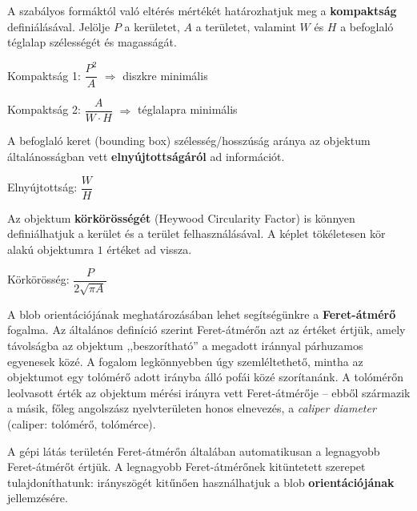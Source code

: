 A szabályos formáktól való eltérés mértékét határozhatjuk meg a \textbf{kompaktság} definiálásával. Jelölje $P$ a kerületet, $A$ a területet, valamint $W$ és $H$ a befoglaló téglalap szélességét és magasságát.

\begin{definition}{Kompaktság 1:}
$\dfrac{P^2}{A}$ $\Longrightarrow$ diszkre minimális
\end{definition}

\begin{definition}{Kompaktság 2:}
$\dfrac{A}{W \cdot H}$ $\Longrightarrow$ téglalapra minimális
\end{definition}

\bigskip

A befoglaló keret (bounding box) szélesség/hosszúság aránya az objektum általánosságban vett \textbf{elnyújtottságáról} ad információt. 

\begin{definition}{Elnyújtottság:}
$\dfrac{W}{H}$
\end{definition}

\bigskip

Az objektum \textbf{körkörösségét} (Heywood Circularity Factor) is könnyen definiálhatjuk a kerület és a terület felhasználásával. A képlet tökéletesen kör alakú objektumra $1$ értéket ad vissza.

\begin{definition}{Körkörösség:}
$\dfrac{P}{2 \sqrt{\pi A}}$
\end{definition}

\bigskip

A blob orientációjának meghatározásában lehet segítségünkre a \textbf{Feret-átmérő} fogalma. Az általános definíció szerint Feret-átmérőn azt az értéket értjük, amely távolságba az objektum ,,beszorítható'' a megadott iránnyal párhuzamos egyenesek közé. A fogalom legkönnyebben úgy szemléltethető, mintha az objektumot egy tolómérő adott irányba álló pofái közé szorítanánk. A tolómérőn leolvasott érték az objektum mérési irányra vett Feret-átmérője -- ebből származik a másik, főleg angolszász nyelvterületen honos elnevezés, a \emph{caliper diameter} (caliper: tolómérő, tolómérce). 

A gépi látás területén Feret-átmérőn általában automatikusan a legnagyobb Feret-átmérőt értjük. A legnagyobb Feret-átmérőnek kitüntetett szerepet tulajdoníthatunk: irányszögét kitűnően használhatjuk a blob \textbf{orientációjának} jellemzésére.

